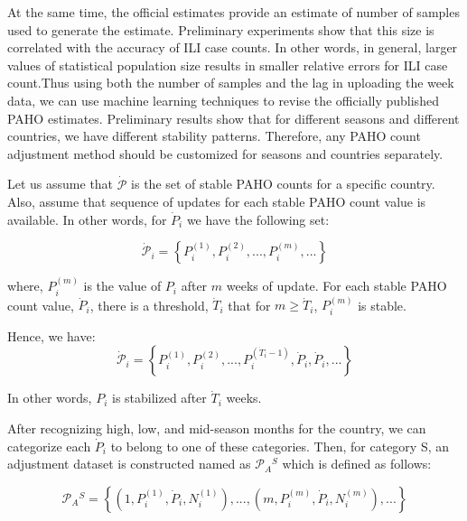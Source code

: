 
At the same time, the official estimates provide an estimate of number of samples
used to generate the estimate. Preliminary experiments show that
this size is correlated with the accuracy of ILI case counts. In other words,
in general, larger values of statistical population size results in smaller
relative errors for ILI case count.Thus using both the number of samples and the lag in 
uploading the week data, we can use machine learning techniques to revise the officially 
published PAHO estimates. Preliminary results
show that for different seasons and different countries, we have different
stability patterns. Therefore, any PAHO count adjustment method should be
customized for seasons and countries separately. 

Let us assume that $\dot{\mathcal{P}}$ is the set of stable PAHO counts for a
specific country. Also, assume that sequence of updates for each stable PAHO
count value is available. In other words, for $\dot{P}_i$ we have the following
set:
 
\begin{equation}
\dot{\mathcal{P}}_i = \left \{P_i^{(1)},P_i^{(2)},...,P_i^{(m)},...  \right \}
\end{equation}

where, $P_i^{(m)}$ is the value of $P_i$ after $m$ weeks of update. 
For each stable PAHO count value, $\dot{P}_i$, there is a threshold, 
$\dot{T}_i$ that for $m \ge \dot{T}_i$, $P_i^{(m)}$ is stable.

Hence, we have:
\begin{equation}
\dot{\mathcal{P}}_i = \left \{P_i^{(1)},P_i^{(2)},...,P_i
^{(\dot{T}_i-1)},\dot{P}_i,\dot{P}_i,...  \right \}
\end{equation}

In other words, $P_i$ is stabilized after $\dot{T}_i$ weeks.



After recognizing high, low, and mid-season months for the country, we can
categorize each $\dot{P}_i$ to belong to one of these categories. Then, for
category S, an adjustment dataset is constructed named as $\mathcal{P}_A{^S}$
which is defined as follows:

\begin{equation}
\mathcal{P}_A{^S} = \left \{ (1,P_i^{(1)},\dot{P}_i,N_i^{(1)}),...,(m,P_i^{(m)},\dot{P}_i,N_i^{(m)}), ...  \right \}
\end{equation}

